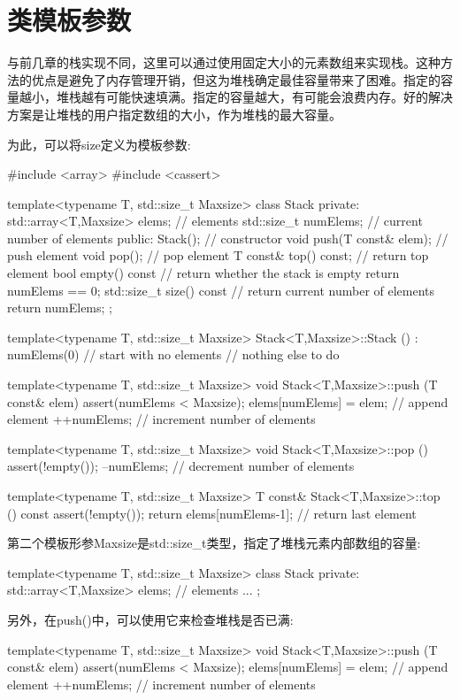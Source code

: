 \section{类模板参数}
与前几章的栈实现不同，这里可以通过使用固定大小的元素数组来实现栈。这种方法的优点是避免了内存管理开销，但这为堆栈确定最佳容量带来了困难。指定的容量越小，堆栈越有可能快速填满。指定的容量越大，有可能会浪费内存。好的解决方案是让堆栈的用户指定数组的大小，作为堆栈的最大容量。

为此，可以将size定义为模板参数:

\begin{cpp}
#include <array>
#include <cassert>

template<typename T, std::size_t Maxsize>
class Stack {
private:
	std::array<T,Maxsize> elems; // elements
	std::size_t numElems; // current number of elements
public:
	Stack(); // constructor
	void push(T const& elem); // push element
	void pop(); // pop element
	T const& top() const; // return top element
	bool empty() const { // return whether the stack is empty
		return numElems == 0;
	}
	std::size_t size() const { // return current number of elements
		return numElems;
	}
};

template<typename T, std::size_t Maxsize>
Stack<T,Maxsize>::Stack ()
: numElems(0) // start with no elements
{
	// nothing else to do
}

template<typename T, std::size_t Maxsize>
void Stack<T,Maxsize>::push (T const& elem)
{
	assert(numElems < Maxsize);
	elems[numElems] = elem; // append element
	++numElems; // increment number of elements
}

template<typename T, std::size_t Maxsize>
void Stack<T,Maxsize>::pop ()
{
	assert(!empty());
	--numElems; // decrement number of elements
}

template<typename T, std::size_t Maxsize>
T const& Stack<T,Maxsize>::top () const
{
	assert(!empty());
	return elems[numElems-1]; // return last element
}
\end{cpp}

第二个模板形参Maxsize是std::size\_t类型，指定了堆栈元素内部数组的容量:

\begin{cpp}
template<typename T, std::size_t Maxsize>
class Stack {
private:
	std::array<T,Maxsize> elems; // elements
	...
};
\end{cpp}

另外，在push()中，可以使用它来检查堆栈是否已满:

\begin{cpp}
template<typename T, std::size_t Maxsize>
void Stack<T,Maxsize>::push (T const& elem)
{
	assert(numElems < Maxsize);
	elems[numElems] = elem; // append element
	++numElems; // increment number of elements
}
\end{cpp}


